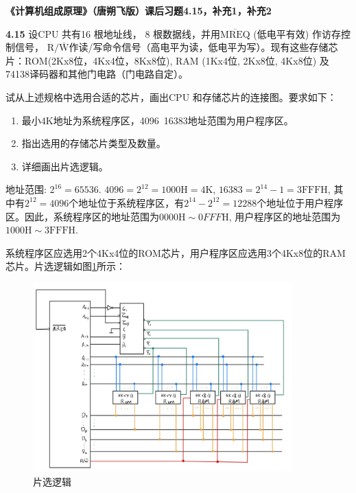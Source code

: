 \documentclass[UTF8]{report}
\newcommand{\mrm}[1]{\mathrm{#1}}
\newcommand{\problem}[1]{{\setlength{\parskip}{10pt}\noindent \bf{#1}}}
\newenvironment{solution}{{\noindent\hskip 2em \bf 解 \quad}}{}
\begin{document}

\maketitle



\textbf{《计算机组成原理》（唐朔飞版）课后习题4.15，补充1，补充2}

\problem{4.15} 设CPU 共有16 根地址线， 8 根数据线，并用$\overline{\mrm{MREQ}}$ (低电平有效) 作访存控制信号， $\mrm{R/\overline{W}}$作读/写命令信号（高电平为读，低电平为写）。现有这些存储芯片：ROM(2Kx8位，4Kx4位，8Kx8位), RAM (1Kx4位, 2Kx8位, 4Kx8位) 及74138译码器和其他门电路（门电路自定）。

试从上述规格中选用合适的芯片，画出CPU 和存储芯片的连接图。要求如下：
\begin{enumerate}[label=(\arabic*)]
    \item 最小4K地址为系统程序区，4096~16383地址范围为用户程序区。
    \item 指出选用的存储芯片类型及数量。
    \item 详细画出片选逻辑。
\end{enumerate}

\begin{solution}
    地址范围: $2^{16} = 65536$. $4096 = 2^{12} = 1000 \mrm H = 4\mrm K$, $16383 = 2^{14} - 1 = 3\mrm{FFF H}$, 其中有$2^{12} = 4096$个地址位于系统程序区，有$2^{14} - 2^{12} = 12288$个地址位于用户程序区。因此，系统程序区的地址范围为$0000 \mrm H \sim 0FFF \mrm H$, 用户程序区的地址范围为$1000 \mrm H \sim 3\mrm{FFF H}$.

    系统程序区应选用2个4Kx4位的ROM芯片，用户程序区应选用3个4Kx8位的RAM芯片。片选逻辑如图\ref{fig:4_15}所示：
    \begin{figure}[!htbp]
        \centering
        \includegraphics[width=10cm]{fig/4.15.png}
        \caption{片选逻辑}
        \label{fig:4_15}
    \end{figure}
\end{solution}
    
\end{document}
